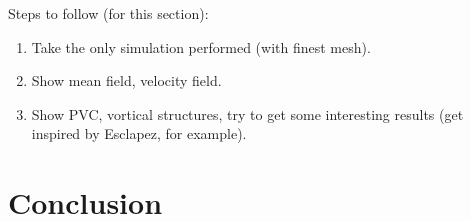 Steps to follow (for this section):

\begin{enumerate}
	
	\item Take the only simulation performed (with finest mesh).
	
	\item Show mean field, velocity field.
	
	\item Show PVC, vortical structures, try to get some interesting results (get inspired by Esclapez, for example).
	

\end{enumerate}


\section{Conclusion}

%
%
%
%
%
